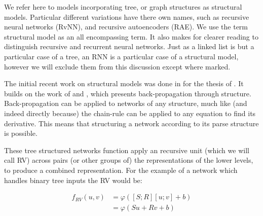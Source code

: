 \documentclass[12pt,parskip]{komatufte}
\begin{document}


We refer here to models incorporating tree, or graph structures as structural models.
Particular different variations have there own names, such as recursive neural networks (RvNN), and recursive autoencoders (RAE).
We use the term structural model as an all encompassing term. 
It also makes for clearer reading to distinguish recursive and recurrent  neural networks.
Just as a linked list is but a particular case of a tree, an RNN is a particular case of a structural model,
however we will exclude them from this discussion except where marked.


The initial recent work on structural models was done in for the thesis of .
It builds on the work of  and , which presents back-propagation through structure.
Back-propagation can be applied to networks of any structure, much like (and indeed directly because) the chain-rule can be applied to any equation to find its derivative.
This means that structuring a network according to its parse structure is possible.


These tree structured networks function apply an recursive unit (which we will call RV) across pairs (or other groups of) the representations of the lower levels, to produce a combined representation.
For the example of a network which handles binary tree inputs the RV would be:

\begin{align}
	f_{RV}(u, v) &= \varphi\left( [S;R][u;v] + b \right) \\
			     &= \varphi\left( Su +Rv + b \right)
\end{align}
\end{document}
